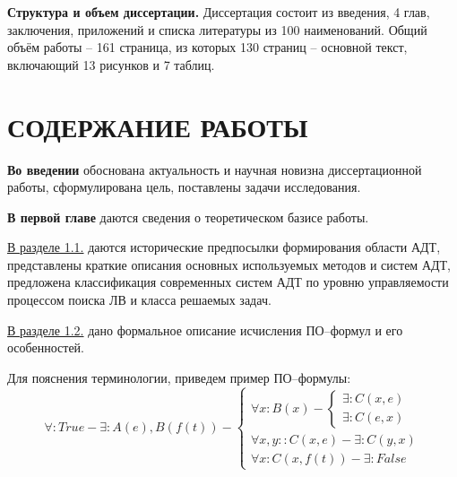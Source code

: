 \documentclass[a4paper]{report}
\begin{document}

\textbf{Структура и объем диссертации.} Диссертация состоит из введения, 4 глав, заключения, приложений и списка литературы из 100 наименований. Общий объём работы -- 161 страница, из которых 130 страниц -- основной текст, включающий 13 рисунков и 7 таблиц.


\section*{СОДЕРЖАНИЕ РАБОТЫ}


\textbf{Во введении} обоснована актуальность и научная новизна диссертационной работы, сформулирована цель, поставлены задачи исследования.


\textbf{В первой главе} даются сведения о теоретическом базисе работы.

\underline{В разделе 1.1.} даются исторические предпосылки формирования области АДТ, представлены краткие описания основных используемых методов и систем АДТ, предложена классификация современных систем АДТ по уровню управляемости процессом поиска ЛВ и класса решаемых задач.%

\underline{В разделе 1.2.} дано формальное описание исчисления ПО--формул и его особенностей.

Для пояснения терминологии, приведем пример ПО--формулы:
$$
\forall\colon True - \exists\colon A(e),B(f(t)) - \left\{
\begin{array}{lcl}
 \forall x \colon B(x) - \left\{
     \begin{array}{lcl}
     \exists \colon C(x,e) \\
     \exists \colon C(e,x)
    \end{array}\right. \\
 \forall x,y \colon \colon C(x,e) - \exists\colon C(y,x) \\
 \forall x \colon C(x,f(t)) - \exists\colon False
\end{array}
\right.
$$
\end{document}

